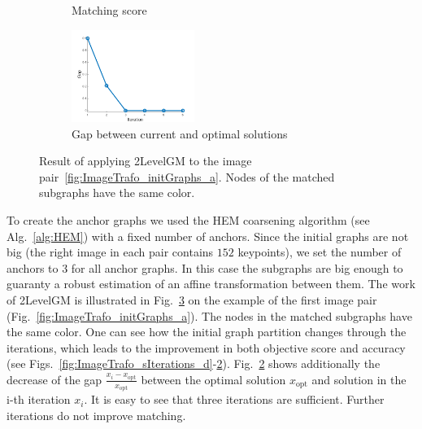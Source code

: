 \begin{figure}
\begin{center}
\begin{subfigure}[t]{0.33\textwidth}
			\caption{Matching score\hspace{5pt}}
			\label{fig:ImageTrafo_sIterations_e}
		\end{subfigure}
		\begin{subfigure}[t]{0.3\textwidth}
			\includegraphics[width=4cm]{"chapter3/fig/ImageTrafo/sIterations/gap"}
			\caption{Gap between current and optimal solutions}
			\label{fig:ImageTrafo_sIterations_f}
		\end{subfigure} 	
	\end{center}		
	\caption[Result of applying 2LevelGM to the image pair~\ref{fig:ImageTrafo_initGraphs_a}]{Result of applying 2LevelGM to the image pair~\ref{fig:ImageTrafo_initGraphs_a}. Nodes of the matched subgraphs have the same color.}
	\label{fig:ImageTrafo_sIterations}
\end{figure}

To create the anchor graphs we used the HEM coarsening algorithm (see Alg.~\ref{alg:HEM}) with a fixed number of anchors. Since the initial graphs are not big (the right image in each pair contains $152$ keypoints), we set the number of anchors to $3$ for all anchor graphs. In this case the subgraphs are big enough to guaranty a robust estimation of an affine transformation between them. The work of 2LevelGM is illustrated in Fig.~\ref{fig:ImageTrafo_sIterations} on the example of the first image pair (Fig.~\ref{fig:ImageTrafo_initGraphs_a}). The nodes in the matched subgraphs have the same color. One can see how the initial graph partition changes through the iterations, which leads to the improvement in both objective score and accuracy (see Figs.~\ref{fig:ImageTrafo_sIterations_d}-\ref{fig:ImageTrafo_sIterations_f}). Fig.~\ref{fig:ImageTrafo_sIterations_f} shows additionally the decrease of the gap $\frac{x_i-x_{\text{opt}}}{x_{\text{opt}}}$ between the optimal solution $x_{\text{opt}}$ and solution in the i-th iteration $x_i$. It is easy to see that three iterations are sufficient. Further iterations do not improve matching.

